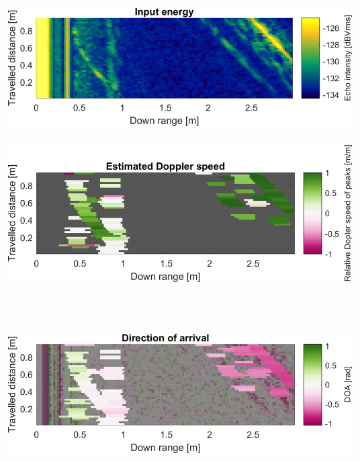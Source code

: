 \begin{figure}[htbp]
    \centering
    \begin{subfigure}[t]{0.475\linewidth}
        \centering
        \includegraphics[width=\linewidth,max height=.475\textheight]{gfx/results/y_input.png}
    \end{subfigure}%
    \hfill%
    \begin{subfigure}[t]{0.475\linewidth}
        \centering
        \includegraphics[width=\linewidth,max height=.475\textheight]{gfx/results/y_doppler.png}
    \end{subfigure}\bigskip\\
    \begin{subfigure}[t]{0.475\linewidth}
        \centering
        \includegraphics[width=\linewidth,max height=.475\textheight]{gfx/results/y_doa.png}
    \end{subfigure}%
    \hfill%
    \begin{subfigure}[t]{0.475\linewidth}
        \centering

\end{subfigure}
\end{figure}
